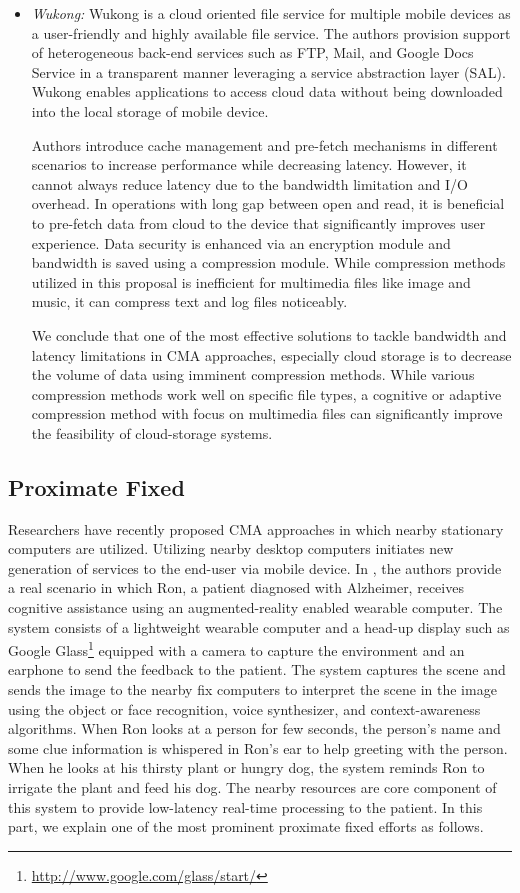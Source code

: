 \documentclass[publish]{IEEEtran}
\begin{document}
\begin{itemize}
\item \textit{Wukong:}
Wukong \cite{Mao2011} is a cloud oriented file service for multiple mobile devices as a user-friendly and highly available file service. The authors provision support of heterogeneous back-end services such as FTP, Mail, and Google Docs Service in a transparent manner leveraging a service abstraction layer (SAL). Wukong enables applications to access cloud data without being downloaded into the local storage of mobile device.

Authors introduce cache management and pre-fetch mechanisms in different scenarios to increase performance while decreasing latency. However, it cannot always reduce latency due to the bandwidth limitation and I/O overhead. In operations with long gap between open and read, it is beneficial to pre-fetch data from cloud to the device that significantly improves user experience. Data security is enhanced via an encryption module and bandwidth is saved using a compression module. While compression methods utilized in this proposal is inefficient for multimedia files like image and music, it can compress text and log files noticeably. 

We conclude that one of the most effective solutions to tackle bandwidth and latency limitations in CMA approaches, especially cloud storage is to decrease the volume of data using imminent compression methods. While various compression methods work well on specific file types, a cognitive or adaptive compression method with focus on multimedia files can significantly improve the feasibility of cloud-storage systems.
\end{itemize}

\subsection{Proximate Fixed}
Researchers have recently proposed CMA approaches in which nearby stationary computers are utilized. Utilizing nearby desktop computers initiates new generation of services to the end-user via mobile device. In \cite{Satyanarayanan2009}, the authors provide a real scenario in which Ron, a patient diagnosed with Alzheimer, receives cognitive assistance using an augmented-reality enabled wearable computer. The system consists of a lightweight wearable computer and a head-up display such as Google Glass\footnote{\url{http://www.google.com/glass/start/}} equipped with a camera to capture the environment and an earphone to send the feedback to the patient. The system captures the scene and sends the image to the nearby fix computers to interpret the scene in the image using the object or face recognition, voice synthesizer, and context-awareness algorithms. When Ron looks at a person for few seconds, the person's name and some clue information is whispered in Ron's ear to help greeting with the person. When he looks at his thirsty plant or hungry dog, the system reminds Ron to irrigate the plant and feed his dog. The nearby resources are core component of this system to provide low-latency real-time processing to the patient. In this part, we explain one of the most prominent proximate fixed efforts as follows.
\end{document}
